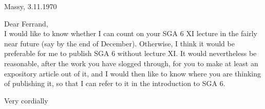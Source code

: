 
\begin{flushright}
Massy, 3.11.1970\\
\end{flushright}

\noindent Dear Ferrand,\\

I would like to know whether I can count on your SGA 6 XI lecture in the fairly near future (say by the end of December). Otherwise, I think it would be preferable for me to publish SGA 6 without lecture XI. It would nevertheless be reasonable, after the work you have slogged through, for you to make at least an expository article out of it, and I would then like to know where you are thinking of publishing it, so that I can refer to it in the introduction to SGA 6.

Very cordially\\

\par\vspace*{0.43\textheight}
\noindent\hfill\parbox[c]{9mm}{}\hspace*{0.025\linewidth}\par
\clearpage
